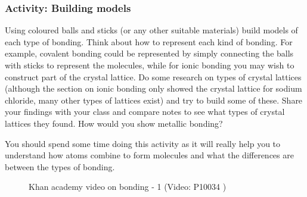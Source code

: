             \subsubsection{ Activity: Building models}
            \nopagebreak
        \label{m38694*id87434}Using coloured balls and sticks (or any other suitable materials) build models of each type of bonding. Think about how to represent each kind of bonding. For example, covalent bonding could be represented by simply connecting the balls with sticks to represent the molecules, while for ionic bonding you may wish to construct part of the crystal lattice. Do some research on types of crystal lattices (although the section on ionic bonding only showed the crystal lattice for sodium chloride, many other types of lattices exist) and try to build some of these. Share your findings with your class and compare notes to see what types of crystal lattices they found. How would you show metallic bonding?\par 
        \label{m38694*id8754}You should spend some time doing this activity as it will really help you to understand how atoms combine to form molecules and what the differences are between the types of bonding. \par 
\label{m38694*eip-515}
    \setcounter{subfigure}{0}
	\begin{figure}[H] %
    \textnormal{Khan academy video on bonding - 1}\vspace{.1in} \nopagebreak
  \label{m38694*yt-media1}\label{m38694*yt-video1}
             { (Video:  P10034 )}
      \vspace{2pt}
    \vspace{.1in}
 \end{figure}       \par \label{m38694*secfhsst!!!underscore!!!id617}
